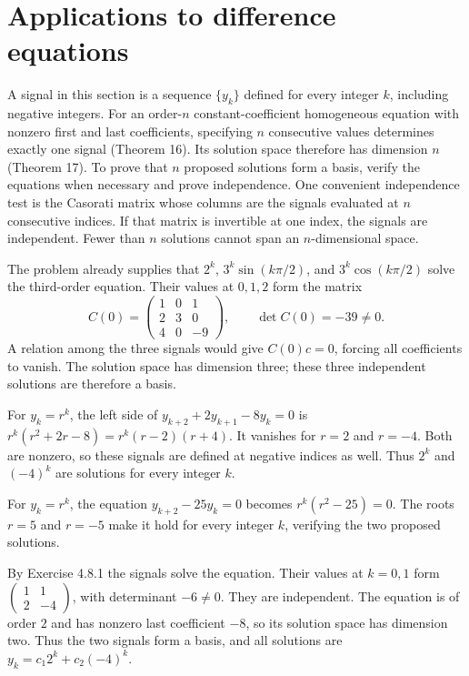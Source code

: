 \section{Applications to difference equations}
A signal in this section is a sequence $\{y_k\}$ defined for every integer
$k$, including negative integers. For an order-$n$ constant-coefficient
homogeneous equation with nonzero first and last coefficients, specifying
$n$ consecutive values determines exactly one signal (Theorem 16).
Its solution space therefore has dimension $n$ (Theorem 17).
To prove that $n$ proposed solutions form a basis, verify the equations
when necessary and prove independence. One convenient independence test is
the Casorati matrix whose columns are the signals evaluated at $n$
consecutive indices. If that matrix is invertible at one index, the signals
are independent. Fewer than $n$ solutions cannot span an $n$-dimensional space.

The problem already supplies that $2^k$, $3^k\sin(k\pi/2)$, and
$3^k\cos(k\pi/2)$ solve the third-order equation. Their values at $0,1,2$
form the matrix
\[
 C(0)=\begin{pmatrix}1&0&1\\2&3&0\\4&0&-9\end{pmatrix},
 \qquad\det C(0)=-39\ne0.
\]
A relation among the three signals would give $C(0)c=0$, forcing all
coefficients to vanish. The solution space has dimension three; these
three independent solutions are therefore a basis.

For $y_k=r^k$, the left side of $y_{k+2}+2y_{k+1}-8y_k=0$ is
$r^k(r^2+2r-8)=r^k(r-2)(r+4)$. It vanishes for $r=2$ and $r=-4$.
Both are nonzero, so these signals are defined at negative indices as well.
Thus $2^k$ and $(-4)^k$ are solutions for every integer $k$.

For $y_k=r^k$, the equation $y_{k+2}-25y_k=0$ becomes
$r^k(r^2-25)=0$. The roots $r=5$ and $r=-5$ make it hold for every
integer $k$, verifying the two proposed solutions.

By Exercise 4.8.1 the signals solve the equation. Their values at $k=0,1$
form $\left(\begin{smallmatrix}1&1\\2&-4\end{smallmatrix}\right)$,
with determinant $-6\ne0$. They are independent. The equation is of order
$2$ and has nonzero last coefficient $-8$, so its solution space has
dimension two. Thus the two signals form a basis, and all solutions are
$y_k=c_1 2^k+c_2(-4)^k$.

